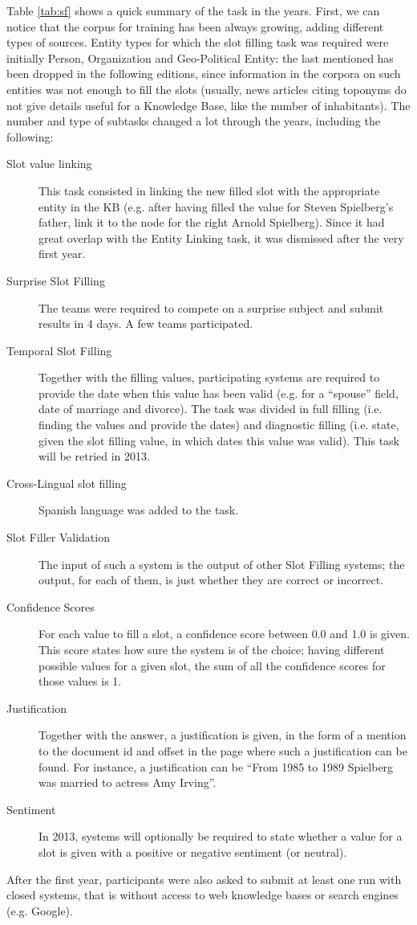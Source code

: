 \documentclass[a4paper,11pt]{report}
\begin{document}
Table \ref{tab:sf} shows a quick summary of the task in the years. First, we can notice that the corpus for training has been always growing, adding different types of sources. Entity types for which the slot filling task was required were initially Person, Organization and Geo-Political Entity: the last mentioned has been dropped in the following editions, since information in the corpora on such entities was not enough to fill the slots (usually, news articles citing toponyms do not give details useful for a Knowledge Base, like the number of inhabitants).
The number and type of subtasks changed a lot through the years, including the following:
\begin{description}
\item[Slot value linking] This task consisted in linking the new filled slot with the appropriate entity in the KB (e.g. after having filled the value for Steven Spielberg's father, link it to the node for the right Arnold Spielberg). Since it had great overlap with the Entity Linking task, it was dismissed after the very first year.
\item[Surprise Slot Filling] The teams were required to compete on a surprise subject and submit results in 4 days. A few teams participated.
\item[Temporal Slot Filling] Together with the filling values, participating systems are required to provide the date when this value has been valid (e.g. for a ``spouse'' field, date of marriage and divorce). The task was divided in full filling (i.e. finding the values and provide the dates) and diagnostic filling (i.e. state, given the slot filling value, in which dates this value was valid). This task will be retried in 2013.
\item[Cross-Lingual slot filling] Spanish language was added to the task.
\item[Slot Filler Validation] The input of such a system is the output of other Slot Filling systems; the output, for each of them, is just whether they are correct or incorrect.
\item[Confidence Scores] For each value to fill a slot, a confidence score between 0.0 and 1.0 is given. This score states how sure the system is of the choice; having different possible values for a given slot, the sum of all the confidence scores for those values is 1.
\item[Justification] Together with the answer, a justification is given, in the form of a mention to the document id and offset in the page where such a justification can be found. For instance, a justification can be ``From 1985 to 1989 Spielberg was married to actress Amy Irving''.
\item[Sentiment] In 2013, systems will optionally be required to state whether a value for a slot is given with a positive or negative sentiment (or neutral).
\end{description}
After the first year, participants were also asked to submit at least one run with closed systems, that is without access to web knowledge bases or search engines (e.g. Google).
\end{document}
